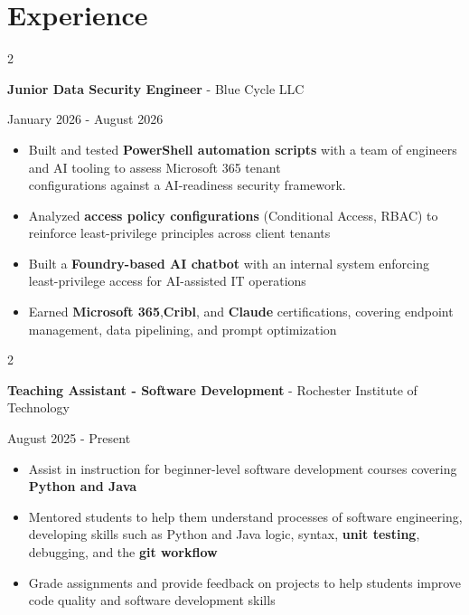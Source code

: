\documentclass[10pt, letterpaper]{article}
\newenvironment{highlights}{
    \begin{itemize}[
        topsep=0.10 cm,
        parsep=0.10 cm,
        partopsep=0pt,
        itemsep=0pt,
        leftmargin=0.4 cm + 10pt
    ]
}{
    \end{itemize}
} %
\newenvironment{twocolentry}[2][]{
    \onecolentry
    \def\secondColumn{#2}
    \setcolumnwidth{\fill, 4.5 cm}
    \begin{paracol}{2}
}{
    \switchcolumn \raggedleft \secondColumn
    \end{paracol}
    \endonecolentry
} %
\begin{document}
    \vspace{-0.2cm}
    
    \section{Experience}

\begin{twocolentry}
    {January 2026 - August 2026}
    {\textbf{Junior Data Security Engineer} - Blue Cycle LLC}
\end{twocolentry}
\begin{highlights}
    \item Built and tested {\color{purple}\textbf{PowerShell automation scripts}} with a team of engineers and AI tooling to assess Microsoft 365 tenant \\ configurations against a AI-readiness security framework. 
    \item Analyzed {\color{purple}\textbf{access policy configurations}} (Conditional Access, RBAC) to reinforce least-privilege principles across client tenants
    \item Built a {\color{purple}\textbf{Foundry-based AI chatbot}} with an internal system enforcing least-privilege access for AI-assisted IT operations
    \item Earned {\color{purple}\textbf{Microsoft 365}},{\color{purple}\textbf{Cribl}}, and {\color{purple}\textbf{Claude}} certifications, covering endpoint management, data pipelining, and prompt optimization
\end{highlights}
\vspace{0.05 cm}
\begin{twocolentry}
    {August 2025 - Present}
    {\textbf{Teaching Assistant - Software Development} - Rochester Institute of Technology}
\end{twocolentry}        
            \begin{highlights}
            \item Assist in instruction for beginner-level software development courses covering {\color{purple}\textbf{Python and Java}}
            \item Mentored students to help them understand processes of software engineering, developing skills such as Python and Java logic, syntax, {\color{purple}\textbf{unit testing}}, debugging, and the  {\color{purple}\textbf{git workflow}}
            \item Grade assignments and provide feedback on projects to help students improve code quality and software development skills
            \end{highlights}
\end{document}
